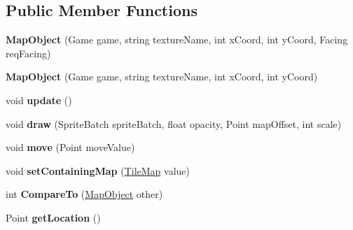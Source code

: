 \subsection*{Public Member Functions}
\begin{DoxyCompactItemize}
\item 
\hypertarget{class_simple_r_p_g_1_1_map_object_ac8d60dc3cf08cb96a718209e32beecda}{{\bfseries Map\+Object} (Game game, string texture\+Name, int x\+Coord, int y\+Coord, Facing req\+Facing)}\label{class_simple_r_p_g_1_1_map_object_ac8d60dc3cf08cb96a718209e32beecda}

\item 
\hypertarget{class_simple_r_p_g_1_1_map_object_aa3fefac8f45293267c07618a32293ea0}{{\bfseries Map\+Object} (Game game, string texture\+Name, int x\+Coord, int y\+Coord)}\label{class_simple_r_p_g_1_1_map_object_aa3fefac8f45293267c07618a32293ea0}

\item 
\hypertarget{class_simple_r_p_g_1_1_map_object_a4f44437b2648e204421cb4ebe20444b2}{void {\bfseries update} ()}\label{class_simple_r_p_g_1_1_map_object_a4f44437b2648e204421cb4ebe20444b2}

\item 
\hypertarget{class_simple_r_p_g_1_1_map_object_a1140405f31bbcc5fa466c50e0a22bb7e}{void {\bfseries draw} (Sprite\+Batch sprite\+Batch, float opacity, Point map\+Offset, int scale)}\label{class_simple_r_p_g_1_1_map_object_a1140405f31bbcc5fa466c50e0a22bb7e}

\item 
\hypertarget{class_simple_r_p_g_1_1_map_object_aee23ac75f7495b486038e13b056a6e83}{void {\bfseries move} (Point move\+Value)}\label{class_simple_r_p_g_1_1_map_object_aee23ac75f7495b486038e13b056a6e83}

\item 
\hypertarget{class_simple_r_p_g_1_1_map_object_a20db9118baf359ac6b4caa6096adf097}{void {\bfseries set\+Containing\+Map} (\hyperlink{class_simple_r_p_g_1_1_tile_map}{Tile\+Map} value)}\label{class_simple_r_p_g_1_1_map_object_a20db9118baf359ac6b4caa6096adf097}

\item 
\hypertarget{class_simple_r_p_g_1_1_map_object_a0bafe3eee08618c007b554fca627a82e}{int {\bfseries Compare\+To} (\hyperlink{class_simple_r_p_g_1_1_map_object}{Map\+Object} other)}\label{class_simple_r_p_g_1_1_map_object_a0bafe3eee08618c007b554fca627a82e}

\item 
\hypertarget{class_simple_r_p_g_1_1_map_object_ae56bcd20205072762a2500ef9d7fb603}{Point {\bfseries get\+Location} ()}\label{class_simple_r_p_g_1_1_map_object_ae56bcd20205072762a2500ef9d7fb603}


\end{DoxyCompactItemize}
